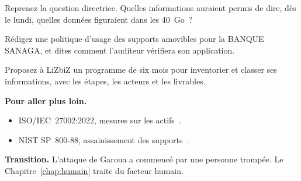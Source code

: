 \begin{boxexo}[title={\ding{45}\quad Exercice~8.8. La fuite \niveaumoyen}]
Reprenez la question directrice. Quelles informations auraient permis de
dire, dès le lundi, quelles données figuraient dans les 40~Go~?
\end{boxexo}

\begin{boxexo}[title={\ding{45}\quad Exercice~8.9. Les supports \niveauexpert}]
Rédigez une politique d'usage des supports amovibles pour la BANQUE
SANAGA, et dites comment l'auditeur vérifiera son application.
\end{boxexo}

\begin{boxexo}[title={\ding{45}\quad Exercice~8.10. Un programme \niveauexpert}]
Proposez à LiZbiZ un programme de six mois pour inventorier et classer
ses informations, avec les étapes, les acteurs et les livrables.
\end{boxexo}

\bigskip

\begin{boxinfo}
\textbf{Pour aller plus loin.}
\begin{itemize}
    \item ISO/IEC~27002:2022, mesures sur les actifs~\cite{iso27002_2022}.
    \item NIST SP~800-88, assainissement des supports~\cite{nist80088}.
\end{itemize}
\end{boxinfo}

\begin{boxinfo}
\textbf{Transition.} L'attaque de Garoua a commencé par une personne
trompée. Le Chapitre~\ref{chap:humain} traite du facteur humain.
\end{boxinfo}
